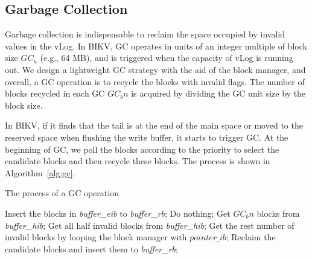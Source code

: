 \documentclass[sigconf]{acmart}
\begin{document}
\subsection{Garbage Collection} \label{ss3}
Garbage collection is indispensable to reclaim the space occupied by invalid values in the vLog. In BIKV, GC operates in units of an integer multiple of block size $GC_u$ (e.g., 64 MB), and is triggered when the capacity of vLog is running out. We design a lightweight GC strategy with the aid of the block manager, and overall, a GC operation is to recycle the blocks with invalid flags. The number of blocks recycled in each GC $GC_bn$ is acquired by dividing the GC unit size by the block size.

In BIKV, if it finds that the tail is at the end of the main space or moved to the reserved space when flushing the write buffer, it starts to trigger GC. At the beginning of GC, we poll the blocks according to the priority to select the candidate blocks and then recycle these blocks. The process is shown in Algorithm~\ref{alg:gc}.
\begin{algorithm}[htbp]
	\caption{The process of a GC operation}
		\begin{algorithmic}[1]
			\STATE Insert the blocks in \textit{buffer\_eib} to \textit{buffer\_rb}; 
			\ENDIF
			\STATE Do nothing;
			\ELSE
			\STATE Get $GC_bn$ blocks from \textit{buffer\_hib};
			\ELSE
			\STATE Get all half invalid blocks from \textit{buffer\_hib};  
			\STATE Get the rest number of invalid blocks by looping the block manager with $pointer\_ib$;
			\ENDIF
			\ENDIF
			\STATE Reclaim the candidate blocks and insert them to \textit{buffer\_rb};
			\ENDIF
		\end{algorithmic}
	\label{alg:gc}
\end{algorithm}
\end{document}

